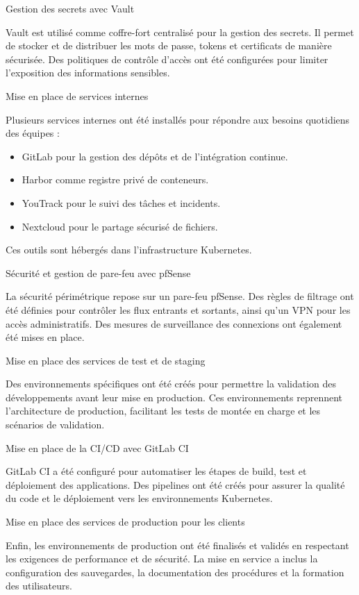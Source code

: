 	{Gestion des secrets avec Vault}

Vault est utilisé comme coffre-fort centralisé pour la gestion des secrets. Il permet de stocker et de distribuer les mots de passe, tokens et certificats de manière sécurisée. Des politiques de contrôle d’accès ont été configurées pour limiter l’exposition des informations sensibles.

	{Mise en place de services internes}

Plusieurs services internes ont été installés pour répondre aux besoins quotidiens des équipes :

\begin{itemize}
	\item GitLab pour la gestion des dépôts et de l’intégration continue.
	\item Harbor comme registre privé de conteneurs.
	\item YouTrack pour le suivi des tâches et incidents.
	\item Nextcloud pour le partage sécurisé de fichiers.
\end{itemize}

Ces outils sont hébergés dans l’infrastructure Kubernetes.

	{Sécurité et gestion de pare-feu avec pfSense}

La sécurité périmétrique repose sur un pare-feu pfSense. Des règles de filtrage ont été définies pour contrôler les flux entrants et sortants, ainsi qu’un VPN pour les accès administratifs. Des mesures de surveillance des connexions ont également été mises en place.

	{Mise en place des services de test et de staging}

Des environnements spécifiques ont été créés pour permettre la validation des développements avant leur mise en production. Ces environnements reprennent l’architecture de production, facilitant les tests de montée en charge et les scénarios de validation.

	{Mise en place de la CI/CD avec GitLab CI}

GitLab CI a été configuré pour automatiser les étapes de build, test et déploiement des applications. Des pipelines ont été créés pour assurer la qualité du code et le déploiement vers les environnements Kubernetes.

	{Mise en place des services de production pour les clients}

Enfin, les environnements de production ont été finalisés et validés en respectant les exigences de performance et de sécurité. La mise en service a inclus la configuration des sauvegardes, la documentation des procédures et la formation des utilisateurs.
